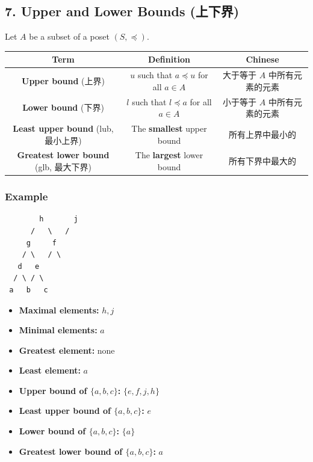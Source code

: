 \documentclass[10pt,a4paper,openany]{ctexbook}
\theoremstyle{definition}
\theoremstyle{remark}
\begin{document}
\subsection{7. Upper and Lower Bounds (上下界)}

Let $A$ be a subset of a poset $(S, \preccurlyeq)$.
\begin{center}
\begin{tabular}{ccc}
\hline
Term & Definition & Chinese \\ \hline
\textbf{Upper bound} (上界) & $u$ such that $a \preccurlyeq u$ for all $a \in A$ & 大于等于 $A$ 中所有元素的元素 \\
\textbf{Lower bound} (下界) & $l$ such that $l \preccurlyeq a$ for all $a \in A$ & 小于等于 $A$ 中所有元素的元素 \\
\textbf{Least upper bound} (lub, 最小上界) & The \textbf{smallest} upper bound & 所有上界中最小的 \\
\textbf{Greatest lower bound} (glb, 最大下界) & The \textbf{largest} lower bound & 所有下界中最大的 \\
\hline
\end{tabular}

\end{center}

\subsubsection{Example}

{\footnotesize\begin{verbatim}
        h       j
      /   \   /
     g     f
    / \   / \
   d   e
  / \ / \
 a   b   c
\end{verbatim}}

\begin{itemize}
\item \textbf{Maximal elements:} $h, j$
\item \textbf{Minimal elements:} $a$
\item \textbf{Greatest element:} none
\item \textbf{Least element:} $a$
\item \textbf{Upper bound of $\{a,b,c\}$:} $\{e, f, j, h\}$
\item \textbf{Least upper bound of $\{a,b,c\}$:} $e$
\item \textbf{Lower bound of $\{a,b,c\}$:} $\{a\}$
\item \textbf{Greatest lower bound of $\{a,b,c\}$:} $a$

\end{itemize}
\end{document}
